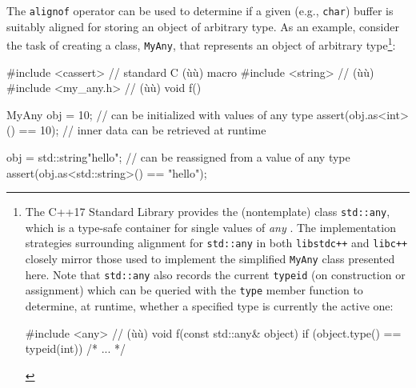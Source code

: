 The \lstinline!alignof! operator can be used to determine if a given (e.g.,
\lstinline!char!) buffer is suitably aligned for storing an object of
arbitrary type. As an example, consider the task of creating a
 class, \lstinline!MyAny!, that represents an object
of arbitrary type{\cprotect\footnote{The C++17 Standard Library provides
the (nontemplate) class \lstinline!std::any!, which is a type-safe
container for single values of \emph{any} . The
implementation strategies surrounding alignment for \lstinline!std::any!
in both \lstinline!libstdc++! and \lstinline!libc++! closely mirror those
used to implement the simplified \lstinline!MyAny! class presented here.
Note that \lstinline!std::any! also records the current \lstinline!typeid!
(on construction or assignment) which can be queried with the \lstinline!type! member
function to determine, at runtime, 
whether a specified type is currently the active one:

\begin{emcppslisting}[emcppsstandards={c++17},style=footcode]
#include <any>  // (ù{}ù)
void f(const std::any& object)
{
    if (object.type() == typeid(int)) { /* ... */ }
}
\end{emcppslisting}
      }}:

\begin{emcppslisting}[emcppsbatch=e2]
#include <cassert>   // standard C (ù{}ù) macro
#include <string>    // (ù{}ù)
#include <my_any.h>  // (ù{}ù)
void f()
{
    MyAny obj = 10;               // can be initialized with values of any type
    assert(obj.as<int>() == 10);  // inner data can be retrieved at runtime

    obj = std::string{"hello"};   // can be reassigned from a value of any type
    assert(obj.as<std::string>() == "hello");
}
\end{emcppslisting}
    
